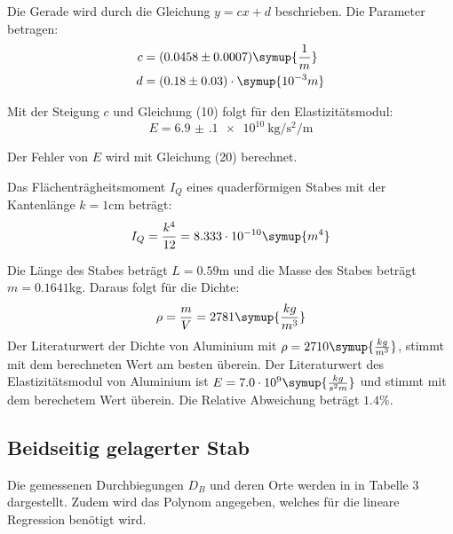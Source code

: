 Die Gerade wird durch die Gleichung $y = cx + d$ beschrieben. Die Parameter betragen:
\begin{align*}
  c &= (0.0458 \pm 0.0007) \symup{\frac{1}{m}} \\
  d &= (0.18  \pm 0.03)   \cdot \symup{10^{-3}m}
\end{align*}


Mit der Steigung $c$ und Gleichung (10) folgt für den Elastizitätsmodul:
\begin{equation}
  E = \SI{6.9(1)e10}{\kilo\gram\per\second\squared\per\meter}
\end{equation}

Der Fehler von $E$ wird mit Gleichung (20) berechnet.

Das Flächenträgheitsmoment $I_Q$ eines quaderförmigen Stabes mit der Kantenlänge
$k = 1$cm beträgt:
\begin{equation}
  I_Q = \frac{k^4}{12} = 8.333 \cdot 10^{-10} \symup{m^4}
\end{equation}


Die Länge des Stabes beträgt $L = 0.59$m und die Masse des Stabes beträgt $m = 0.1641$kg.
Daraus folgt für die Dichte:
\begin{equation}
  \rho = \frac{m}{V} = 2781 \symup{\frac{kg}{m^3}}
\end{equation}
Der Literaturwert der Dichte von Aluminium mit $\rho = 2710 \symup{\frac{kg}{m^3}}$,
stimmt mit dem berechneten Wert am besten überein. Der Literaturwert des Elastizitätsmodul
von Aluminium ist $E = 7.0 \cdot 10^{9} \symup{\frac{kg}{s^2m}}$ und stimmt mit dem berechetem Wert
überein. Die Relative Abweichung beträgt $1.4 \%$.

\subsection{Beidseitig gelagerter Stab}
Die gemessenen Durchbiegungen $D_{B}$ und deren Orte werden in in Tabelle 3 dargestellt. Zudem wird
das Polynom angegeben, welches für die lineare Regression benötigt wird.

